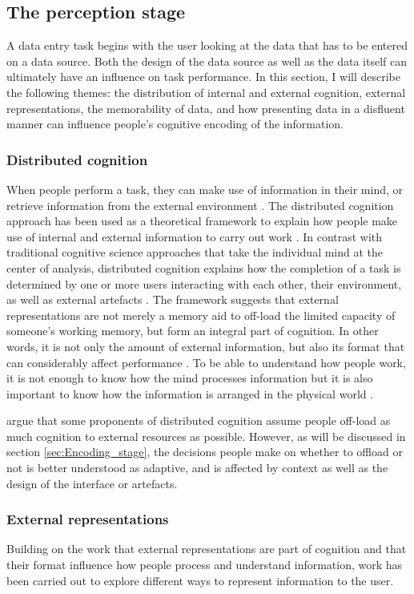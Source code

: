 \subsection{The perception stage}
A data entry task begins with the user looking at the data that has to be entered on a data source.
Both the design of the data source as well as the data itself can ultimately have an influence on task performance. In this section, I will describe the following themes: the distribution of internal and external cognition, external representations, the memorability of data, and how presenting data in a disfluent manner can influence people's cognitive encoding of the information.

\subsubsection{Distributed cognition}
When people perform a task, they can make use of information in their mind, or retrieve information from the external environment \citep{Norman1993}.
The distributed cognition approach has been used as a theoretical framework to explain how people make use of internal and external information to carry out work \citep{Hollan2000}. In contrast with traditional cognitive science approaches that take the individual mind at the center of analysis, distributed cognition explains how the completion of a task is determined by one or more users interacting with each other, their environment, as well as external artefacts \citep{Hutchins1995}. The framework suggests that external representations are not merely a memory aid to off-load the limited capacity of someone's working memory, but form an integral part of cognition. In other words, it is not only the amount of external information, but also its format that can considerably affect performance \citep{Gong2009, Zhang2009}.
To be able to understand how people work, it is not enough to know how the mind processes information but it is also important to know how the information is arranged in the physical world \citep{Hollan2000}. 

\citet{Payne2013} argue that some proponents of distributed cognition assume people off-load as much cognition to external resources as possible. However, as will be discussed in section \ref{sec:Encoding_stage}, the decisions people make on whether to offload or not is better understood as adaptive, and is affected by context as well as the design of the interface or artefacts. 

\subsubsection{External representations}
Building on the work that external representations are part of cognition and that their format influence how people process and understand information, work has been carried out to explore different ways to represent information to the user. 

